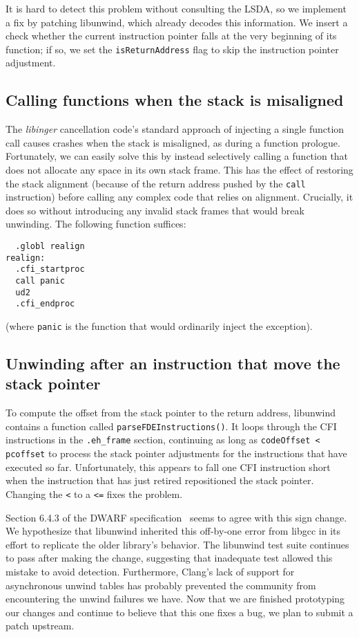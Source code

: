 It is hard to detect this problem without consulting the LSDA, so we implement a fix
by patching libunwind, which already decodes this information.  We insert a check
whether the current instruction pointer falls at the very beginning of its function;
if so, we set the \texttt{isReturnAddress} flag to skip the instruction pointer
adjustment.


\subsection{Calling functions when the stack is misaligned}

The \textit{libinger} cancellation code's standard approach of injecting a single
function call causes crashes when the stack is misaligned, as during a function
prologue.  Fortunately, we can easily solve this by instead selectively calling a
function that does not allocate any space in its own stack frame.  This has the
effect of restoring the stack alignment (because of the return address pushed by the
\texttt{call} instruction) before calling any complex code that relies on alignment.
Crucially, it does so without introducing any invalid stack frames that would break
unwinding.  The following function suffices:
\begin{verbatim}
  .globl realign
realign:
  .cfi_startproc
  call panic
  ud2
  .cfi_endproc
\end{verbatim}

\noindent
(where \texttt{panic} is the function that would ordinarily inject the exception).


\subsection{Unwinding after an instruction that move the stack pointer}

To compute the offset from the stack pointer to the return address, libunwind
contains a function called \texttt{parseFDEInstructions()}.  It loops through the CFI
instructions in the \texttt{.eh\_frame} section, continuing as long as
\texttt{codeOffset < pcoffset} to process the stack pointer adjustments for the
instructions that have executed so far.  Unfortunately, this appears to fall one CFI
instruction short when the instruction that has just retired repositioned the stack
pointer.  Changing the \texttt{<} to a \texttt{<=} fixes the problem.

Section 6.4.3 of the DWARF specification~\cite{www-dwarf-spec} seems to agree with
this sign change.  We hypothesize that libunwind inherited this off-by-one error from
libgcc in its effort to replicate the older library's behavior.  The libunwind test
suite continues to pass after making the change, suggesting that inadequate test
allowed this mistake to avoid detection.  Furthermore, Clang's lack of support for
asynchronous unwind tables has probably prevented the community from encountering the
unwind failures we have.  Now that we are finished prototyping our changes and
continue to believe that this one fixes a bug, we plan to submit a patch upstream.


